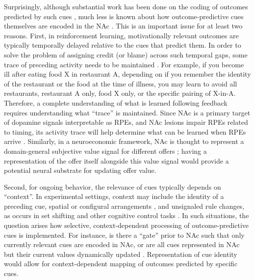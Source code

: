 \documentclass[11pt]{article}
\let\cite=\citep
\begin{document}
Surprisingly, although substantial work has been done on the coding of
outcomes predicted by such cues
\cite{Schultz1992,Hollerman1998,Hassani2001,Cromwell2003,Setlow2003,Nicola2004,Roitman2005,Day2006,Roesch2009a,Saddoris2011,Goldstein2012,Lansink2012,Bissonette2013,McGinty2013,Atallah2014,Sugam2014,Cooch2015,West2016},
much less is known about how outcome-predictive cues themselves are
encoded in the NAc \cite[but see;][]{Sleezer2016}. This is an
important issue for at least two reasons. First, in reinforcement
learning, motivationally relevant outcomes are typically temporally
delayed relative to the cues that predict them. In order to solve the
problem of assigning credit (or blame) across such temporal gaps, some
trace of preceding activity needs to be maintained
\cite{sutton1998,Lee2012}. For example, if you become ill after eating
food X in restaurant A, depending on if you remember the identity of
the restaurant or the food at the time of illness, you may learn to
avoid all restaurants, restaurant A only, food X only, or the specific
pairing of X-in-A. Therefore, a complete understanding of what is
learned following feedback requires understanding what “trace” is
maintained. Since NAc is a primary target of dopamine signals interpretable
as RPEs, and NAc lesions impair RPEs related to timing, its activity
trace will help determine what can be learned when RPEs arrive
\cite{Ikemoto2007,McDannald2011,Hart2014,Hamid2016,Takahashi2016}. Similarly,
in a neuroeconomic framework, NAc is thought to represent a
domain-general subjective value signal for different offers
\cite{Peters2009,Levy2012,Bartra2013,Sescousse2015}; having a representation of
the offer itself alongside this value signal would provide a potential neural substrate for updating offer
value.

Second, for ongoing behavior, the relevance of cues typically depends
on “context”. In experimental settings, context may include the
identity of a preceding cue, spatial or configural arrangements
\cite{Holland1992,Bouton1993,Honey2014}, and unsignaled rule changes, as
occurs in set shifting and other cognitive control tasks
\cite{Grant1948,cohen1992context,Floresco2006a,Sleezer2016}. In such
situations, the question arises how selective, context-dependent
processing of outcome-predictive cues is implemented. For instance, is
there a “gate” prior to NAc such that only currently relevant cues are
encoded in NAc, or are all cues represented in NAc but their current
values dynamically updated
\cite{Goto2008,Fitzgerald2014,Sleezer2016}. Representation of cue
identity would allow for context-dependent mapping of outcomes
predicted by specific cues.
\end{document}

